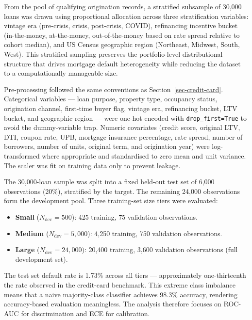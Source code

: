 \documentclass[
  letterpaper,
  DIV=11,
  numbers=noendperiod]{scrartcl}
\providecommand{\tightlist}{%
  \setlength{\itemsep}{0pt}\setlength{\parskip}{0pt}}
\begin{document}
From the pool of qualifying origination records, a stratified subsample
of 30,000 loans was drawn using proportional allocation across three
stratification variables: vintage era (pre-crisis, crisis, post-crisis,
COVID), refinancing incentive bucket (in-the-money, at-the-money,
out-of-the-money based on rate spread relative to cohort median), and US
Census geographic region (Northeast, Midwest, South, West). This
stratified sampling preserves the portfolio-level distributional
structure that drives mortgage default heterogeneity while reducing the
dataset to a computationally manageable size.

Pre-processing followed the same conventions as
Section~\ref{sec-credit-card}. Categorical variables --- loan purpose,
property type, occupancy status, origination channel, first-time buyer
flag, vintage era, refinancing bucket, LTV bucket, and geographic region
--- were one-hot encoded with \texttt{drop\_first=True} to avoid the
dummy-variable trap. Numeric covariates (credit score, original LTV,
DTI, coupon rate, UPB, mortgage insurance percentage, rate spread,
number of borrowers, number of units, original term, and origination
year) were log-transformed where appropriate and standardised to zero
mean and unit variance. The scaler was fit on training data only to
prevent leakage.

The 30,000-loan sample was split into a fixed held-out test set of 6,000
observations (20\%), stratified by the target. The remaining 24,000
observations form the development pool. Three training-set size tiers
were evaluated:

\begin{itemize}
\tightlist
\item
  \textbf{Small} (\(N_{\text{dev}} = 500\)): 425 training, 75 validation
  observations.
\item
  \textbf{Medium} (\(N_{\text{dev}} = 5{,}000\)): 4,250 training, 750
  validation observations.
\item
  \textbf{Large} (\(N_{\text{dev}} = 24{,}000\)): 20,400 training, 3,600
  validation observations (full development set).
\end{itemize}

The test set default rate is 1.73\% across all tiers --- approximately
one-thirteenth the rate observed in the credit-card benchmark. This
extreme class imbalance means that a naive majority-class classifier
achieves 98.3\% accuracy, rendering accuracy-based evaluation
meaningless. The analysis therefore focuses on ROC-AUC for
discrimination and ECE for calibration.
\end{document}
